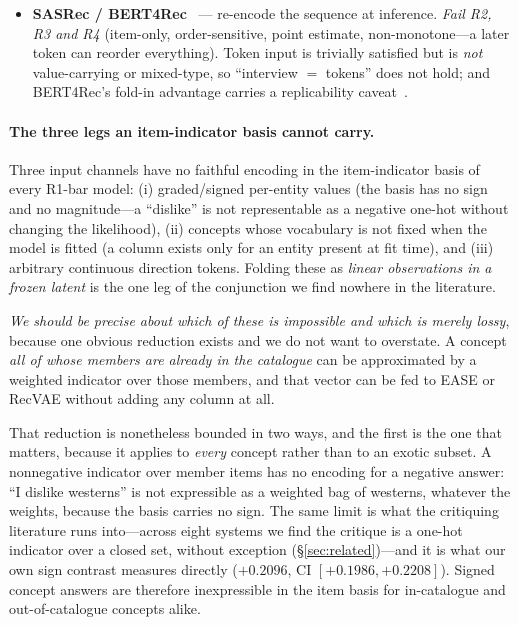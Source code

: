 \documentclass[11pt]{article}
\begin{document}
\begin{itemize}[leftmargin=1.4em,itemsep=2pt]
        vocabulary) $+$ strong cold-start.
        \emph{Fails R1} (no full-profile CF ranking) and its belief is \emph{per item}, not a shared user covariance; no
        monotonicity guarantee, and a yes/no answer carries no intensity (R4).
  \item \textbf{SASRec / BERT4Rec}~\cite{kang2018sasrec,sun2019bert4rec} --- re-encode the sequence at inference.
        \emph{Fail R2, R3 and R4} (item-only, order-sensitive, point estimate, non-monotone---a later token can
        reorder everything). Token input is trivially satisfied but is \emph{not} value-carrying or mixed-type, so
        ``interview $=$ tokens'' does not hold; and BERT4Rec's fold-in advantage carries a replicability
        caveat~\cite{petrov2022replicability}.
\end{itemize}

\paragraph{The three legs an item-indicator basis cannot carry.}
Three input channels have no faithful encoding in the item-indicator basis of every R1-bar model: (i)
graded/signed per-entity values (the basis has no sign and no magnitude---a ``dislike'' is not representable as a
negative one-hot without changing the likelihood), (ii) concepts whose vocabulary is not fixed when the model is
fitted (a column exists only for an entity present at fit time), and (iii) arbitrary continuous direction tokens.
Folding these as \emph{linear observations in a frozen latent} is the one leg of the conjunction we find nowhere in
the literature.

\emph{We should be precise about which of these is impossible and which is merely lossy}, because one obvious
reduction exists and we do not want to overstate. A concept \emph{all of whose members are already in the
catalogue} can be approximated by a weighted indicator over those members, and that vector can be fed to EASE or
RecVAE without adding any column at all.

That reduction is nonetheless bounded in two ways, and the first is the one that matters, because it applies to
\emph{every} concept rather than to an exotic subset. A nonnegative indicator over member items has no encoding
for a negative answer: ``I dislike westerns'' is not expressible as a weighted bag of westerns, whatever the
weights, because the basis carries no sign. The same limit is what the critiquing literature runs into---across
eight systems we find the critique is a one-hot indicator over a closed set, without exception (\S\ref{sec:related})---and it is
what our own sign contrast measures directly ($+0.2096$, CI $[+0.1986,+0.2208]$). Signed concept answers are
therefore inexpressible in the item basis for in-catalogue and out-of-catalogue concepts alike.
\end{document}
